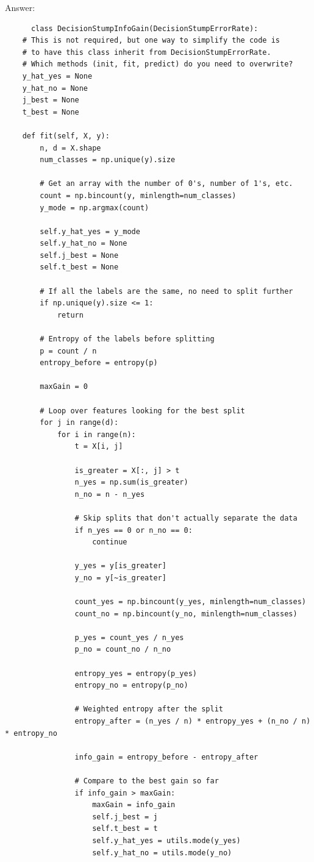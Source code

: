 \documentclass{article}
\newenvironment{answer}{\par\begingroup\color{gre}Answer: }{\endgroup}
\begin{document}
  \begin{answer}
    \begin{lstlisting}
      class DecisionStumpInfoGain(DecisionStumpErrorRate):
    # This is not required, but one way to simplify the code is
    # to have this class inherit from DecisionStumpErrorRate.
    # Which methods (init, fit, predict) do you need to overwrite?
    y_hat_yes = None
    y_hat_no = None
    j_best = None
    t_best = None

    def fit(self, X, y):
        n, d = X.shape
        num_classes = np.unique(y).size

        # Get an array with the number of 0's, number of 1's, etc.
        count = np.bincount(y, minlength=num_classes)
        y_mode = np.argmax(count)

        self.y_hat_yes = y_mode
        self.y_hat_no = None
        self.j_best = None
        self.t_best = None

        # If all the labels are the same, no need to split further
        if np.unique(y).size <= 1:
            return

        # Entropy of the labels before splitting
        p = count / n
        entropy_before = entropy(p)

        maxGain = 0

        # Loop over features looking for the best split
        for j in range(d):
            for i in range(n):
                t = X[i, j]

                is_greater = X[:, j] > t
                n_yes = np.sum(is_greater)
                n_no = n - n_yes

                # Skip splits that don't actually separate the data
                if n_yes == 0 or n_no == 0:
                    continue

                y_yes = y[is_greater]
                y_no = y[~is_greater]

                count_yes = np.bincount(y_yes, minlength=num_classes)
                count_no = np.bincount(y_no, minlength=num_classes)

                p_yes = count_yes / n_yes
                p_no = count_no / n_no

                entropy_yes = entropy(p_yes)
                entropy_no = entropy(p_no)

                # Weighted entropy after the split
                entropy_after = (n_yes / n) * entropy_yes + (n_no / n) * entropy_no

                info_gain = entropy_before - entropy_after

                # Compare to the best gain so far
                if info_gain > maxGain:
                    maxGain = info_gain
                    self.j_best = j
                    self.t_best = t
                    self.y_hat_yes = utils.mode(y_yes)
                    self.y_hat_no = utils.mode(y_no)
    \end{lstlisting}
  \end{answer}
\end{document}
